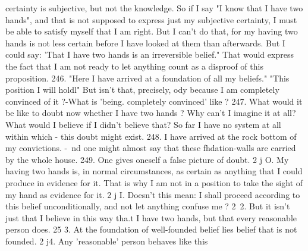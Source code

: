 certainty is subjective, but not the knowledge. So if I say "I
know that I have two hands", and that is not supposed to express
just my subjective certainty, I must be able to satisfy myself that
I am right. But I can't do that, for my having two hands is not
less certain before I have looked at them than afterwards. But I
could say: 'That I have two hands is an irreversible belief." That
would express the fact that I am not ready to let anything count
as a disproof of this proposition.
246. "Here I have arrived at a foundation of all my beliefs."
"This position I will holdl" But isn't that, precisely, ody because
I am completely convinced of it ?-What is 'being. completely convinced' like ?
247. What would it be like to doubt now whether I have two
hands ? Why can't I imagine it at all? What would I believe if I
didn't believe that? So far I have no system at all within which -
this doubt might exist.
248. I have arrived at the rock bottom of my convictions.
-~nd one might almost say that these fhdation-walls are
carried by the whole house.
249. One gives oneself a false picture of doubt.
2 j O. My having two hands is, in normal circumstances, as certain
as anything that I could produce in evidence for it.
That is why I am not in a position to take the sight of my hand
as evidence for it.
2 j I. Doesn't this mean: I shall proceed according to this belief
unconditionally, and not let anything confuse me ?
2~2. But it isn't just that I believe in this way tha.t I have two
hands, but that every reasonable person does.
25 3. At the foundation of well-founded belief lies belief that is
not founded.
2 j4. Any 'reasonable' person behaves like this
